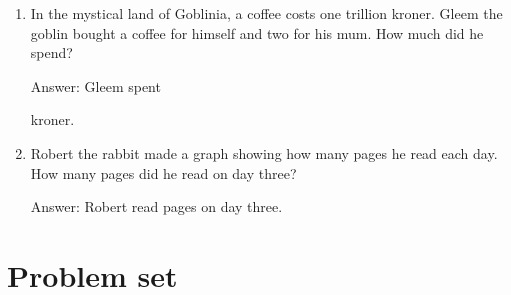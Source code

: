 \documentclass{tufte-book}
\begin{document}
\begin{enumerate}
\item In the mystical land of Goblinia, a coffee costs one trillion kroner.
Gleem the goblin bought a coffee for himself and two for his mum. How much did he spend?\medskip\par
Answer: Gleem spent \dotfill\medskip\par\mbox{}\dotfill\medskip kroner.

\item {}
Robert the rabbit made a graph showing how many pages he read each day.
How many pages did he read on day three?\medskip

Answer: Robert read \dotfill\medskip pages on day three.
\end{enumerate}

\clearpage\section{Problem set }
\end{document}
